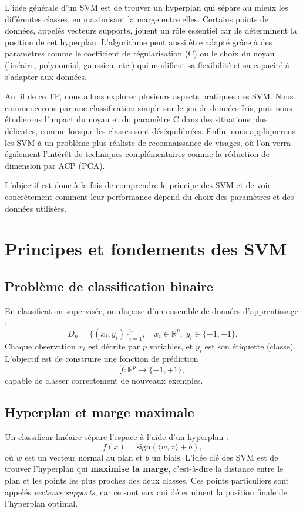 \documentclass[11pt,a4paper]{article}
\begin{document}
L’idée générale d’un SVM est de trouver un hyperplan qui sépare au mieux les différentes classes, en maximisant la marge entre elles. Certains points de données, appelés vecteurs supports, jouent un rôle essentiel car ils déterminent la position de cet hyperplan. L’algorithme peut aussi être adapté grâce à des paramètres comme le coefficient de régularisation (C) ou le choix du noyau (linéaire, polynomial, gaussien, etc.) qui modifient sa flexibilité et sa capacité à s’adapter aux données.

Au fil de ce TP, nous allons explorer plusieurs aspects pratiques des SVM. Nous commencerons par une classification simple sur le jeu de données Iris, puis nous étudierons l’impact du noyau et du paramètre C dans des situations plus délicates, comme lorsque les classes sont déséquilibrées. Enfin, nous appliquerons les SVM à un problème plus réaliste de reconnaissance de visages, où l’on verra également l’intérêt de techniques complémentaires comme la réduction de dimension par ACP (PCA).

L’objectif est donc à la fois de comprendre le principe des SVM et de voir concrètement comment leur performance dépend du choix des paramètres et des données utilisées.

\section{Principes et fondements des SVM}

\subsection{Problème de classification binaire}
En classification supervisée, on dispose d’un ensemble de données d’apprentissage :
\[
D_n = \{(x_i, y_i)\}_{i=1}^n, \quad x_i \in \mathbb{R}^p, \; y_i \in \{-1, +1\}.
\]
Chaque observation $x_i$ est décrite par $p$ variables, et $y_i$ est son étiquette (classe).
L’objectif est de construire une fonction de prédiction
\[
\hat{f} : \mathbb{R}^p \to \{-1, +1\},
\]
capable de classer correctement de nouveaux exemples.

\subsection{Hyperplan et marge maximale}
Un classifieur linéaire sépare l’espace à l’aide d’un hyperplan :
\[
f(x) = \text{sign}(\langle w, x \rangle + b),
\]
où $w$ est un vecteur normal au plan et $b$ un biais.
L’idée clé des SVM est de trouver l’hyperplan qui \textbf{maximise la marge}, c’est-à-dire la distance entre le plan et les points les plus proches des deux classes.
Ces points particuliers sont appelés \textit{vecteurs supports}, car ce sont eux qui déterminent la position finale de l’hyperplan optimal.
\end{document}
